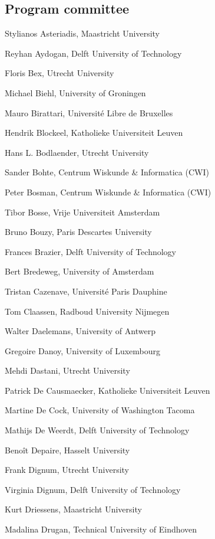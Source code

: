 \documentclass[a4paper,oneside]{book}
\begin{document}
	\subsection*{Program committee}
	\begin{compactitem}[]
		\item[] Stylianos Asteriadis, Maastricht University
		\item[] Reyhan Aydogan, Delft University of Technology
		\item[] Floris Bex, Utrecht University
		\item[] Michael Biehl, University of Groningen
		\item[] Mauro Birattari, Universit\'e Libre de Bruxelles
		\item[] Hendrik Blockeel, Katholieke Universiteit Leuven
		\item[] Hans L. Bodlaender, Utrecht University
		\item[] Sander Bohte, Centrum Wiskunde \& Informatica (CWI)
		\item[] Peter Bosman, Centrum Wiskunde \& Informatica (CWI)
		\item[] Tibor Bosse, Vrije Universiteit Amsterdam
		\item[] Bruno Bouzy, Paris Descartes University
		\item[] Frances Brazier, Delft University of Technology
		\item[] Bert Bredeweg, University of Amsterdam
		\item[] Tristan Cazenave, Universit\'e Paris Dauphine
		\item[] Tom Claassen, Radboud University Nijmegen
		\item[] Walter Daelemans, University of Antwerp
		\item[] Gregoire Danoy, University of Luxembourg
		\item[] Mehdi Dastani, Utrecht University
		\item[] Patrick De Causmaecker, Katholieke Universiteit Leuven
		\item[] Martine De Cock, University of Washington Tacoma
		\item[] Mathijs De Weerdt, Delft University of Technology
		\item[] Beno\^it Depaire, Hasselt University
		\item[] Frank Dignum, Utrecht University
		\item[] Virginia Dignum, Delft University of Technology
		\item[] Kurt Driessens, Maastricht University
		\item[] Madalina Drugan, Technical University of Eindhoven

\end{compactitem}
\end{document}
